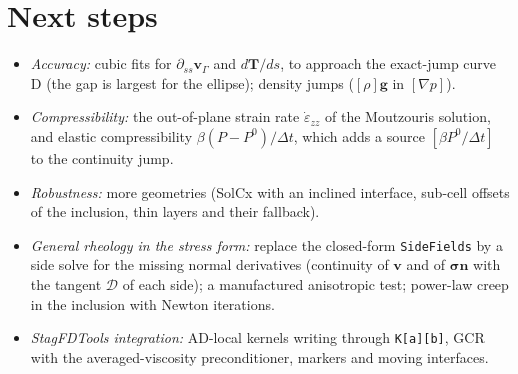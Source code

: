 \documentclass[11pt,a4paper]{article}
\newcommand{\code}[1]{\texttt{#1}}
\begin{document}
\section{Next steps}

\begin{itemize}
  \item \emph{Accuracy:} cubic fits for $\partial_{ss}\mathbf v_\Gamma$ and $d\mathbf T/ds$, to
    approach the exact-jump curve D (the gap is largest for the ellipse); density jumps
    ($[\rho]\mathbf g$ in $[\nabla p]$).
  \item \emph{Compressibility:} the out-of-plane strain rate $\dot\varepsilon_{zz}$ of the
    Moutzouris solution, and elastic compressibility $\beta(P-P^0)/\Delta t$, which adds a source
    $[\beta P^0/\Delta t]$ to the continuity jump.
  \item \emph{Robustness:} more geometries (SolCx with an inclined interface, sub-cell offsets
    of the inclusion, thin layers and their fallback).
  \item \emph{General rheology in the stress form:} replace the closed-form \code{SideFields} by
    a side solve for the missing normal derivatives (continuity of $\mathbf v$ and of
    $\boldsymbol\sigma\mathbf n$ with the tangent $\mathcal D$ of each side); a manufactured
    anisotropic test; power-law creep in the inclusion with Newton iterations.
  \item \emph{StagFDTools integration:} AD-local kernels writing through \code{K[a][b]}, GCR
    with the averaged-viscosity preconditioner, markers and moving interfaces.
\end{itemize}
\end{document}
